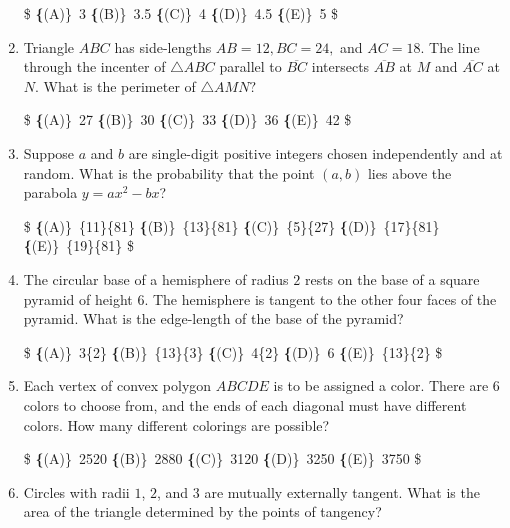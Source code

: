 \documentclass{article}
\begin{document}
\begin{enumerate}[label=\arabic*., itemsep=0.5em]
\$
\textbf\{(A)\}\ 3 \qquad
\textbf\{(B)\}\ 3.5 \qquad
\textbf\{(C)\}\  4 \qquad
\textbf\{(D)\}\ 4.5 \qquad
\textbf\{(E)\}\ 5 \$\par \vspace{0.5em}\item Triangle $ABC$ has side-lengths $AB = 12, BC = 24,$ and $AC = 18.$ The line through the incenter of $\triangle ABC$ parallel to $\overline{BC}$ intersects $\overline{AB}$ at $M$ and $\overline{AC}$ at $N.$ What is the perimeter of $\triangle AMN?$

\$
\textbf\{(A)\}\ 27 \qquad
\textbf\{(B)\}\ 30 \qquad
\textbf\{(C)\}\  33 \qquad
\textbf\{(D)\}\ 36 \qquad
\textbf\{(E)\}\ 42 \$\par \vspace{0.5em}\item Suppose $a$ and $b$ are single-digit positive integers chosen independently and at random. What is the probability that the point $(a,b)$ lies above the parabola $y=ax^2-bx$?

\$
\textbf\{(A)\}\ \frac\{11\}\{81\} \qquad
\textbf\{(B)\}\ \frac\{13\}\{81\} \qquad
\textbf\{(C)\}\ \frac\{5\}\{27\} \qquad
\textbf\{(D)\}\ \frac\{17\}\{81\} \qquad
\textbf\{(E)\}\ \frac\{19\}\{81\} \$\par \vspace{0.5em}\item The circular base of a hemisphere of radius $2$ rests on the base of a square pyramid of height $6$. The hemisphere is tangent to the other four faces of the pyramid. What is the edge-length of the base of the pyramid?

\$
\textbf\{(A)\}\ 3\sqrt\{2\} \qquad
\textbf\{(B)\}\ \frac\{13\}\{3\} \qquad
\textbf\{(C)\}\ 4\sqrt\{2\} \qquad
\textbf\{(D)\}\ 6 \qquad
\textbf\{(E)\}\ \frac\{13\}\{2\} \$\par \vspace{0.5em}\item Each vertex of convex polygon $ABCDE$ is to be assigned a color. There are $6$ colors to choose from, and the ends of each diagonal must have different colors. How many different colorings are possible?

\$
\textbf\{(A)\}\ 2520 \qquad
\textbf\{(B)\}\ 2880 \qquad
\textbf\{(C)\}\ 3120 \qquad
\textbf\{(D)\}\ 3250 \qquad
\textbf\{(E)\}\ 3750 \$\par \vspace{0.5em}\item Circles with radii $1$, $2$, and $3$ are mutually externally tangent. What is the area of the triangle determined by the points of tangency?


\end{enumerate}
\end{document}
